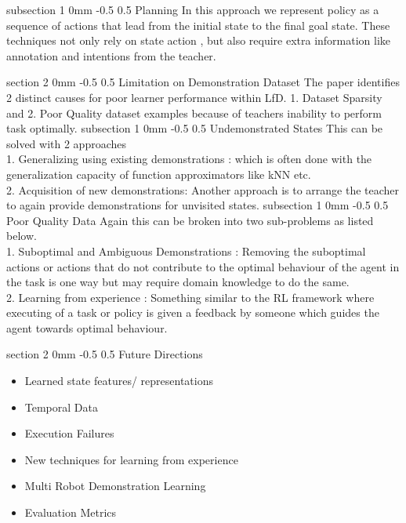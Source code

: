 \documentclass[twocolumn,11pt]{article}
\makeatletter
\renewcommand{\section}{\@startsection
{section}%
{2}%
{0mm}%
{-0.5\baselineskip}%
{0.5\baselineskip}%
{\bfseries\color{blue}}} %
\renewcommand{\subsection}{\@startsection
{subsection}%
{1}%
{0mm}%
{-0.5\baselineskip}%
{0.5\baselineskip}%
{\bfseries\color{blue}}} %
\makeatother
\begin{document}
\subsection{Planning}  In this approach we represent policy as a sequence of actions that lead from the initial state to the final goal state. These techniques not only rely on state action , but also require  extra information like annotation and intentions from the  teacher. 


\section{Limitation on Demonstration Dataset}
The paper  identifies  2  distinct causes for poor learner performance within LfD. 1. Dataset Sparsity  and 2. Poor Quality dataset  examples because of teachers inability to perform task optimally.
 \subsection{Undemonstrated States}
 This can  be solved with 2 approaches\\
  1. Generalizing using existing demonstrations : which  is often done with the generalization capacity of function approximators like kNN etc. \\
  2. Acquisition of new demonstrations: Another approach is to arrange the teacher to again provide demonstrations for unvisited  states. 
  \subsection{Poor Quality Data}
Again this can be broken into  two sub-problems  as listed below.\\
1. Suboptimal  and Ambiguous Demonstrations : Removing the suboptimal actions or actions that do not contribute to the optimal behaviour of the agent in the task is one way but may  require domain knowledge to do the same. \\
2. Learning from experience : Something similar to  the RL framework where executing of a task or policy is  given a feedback by someone which guides the  agent towards optimal behaviour. 

\section{Future Directions}
\begin{itemize}
\item Learned state  features/  representations 
\item Temporal Data 
\item Execution Failures 
\item New techniques for learning from experience
\item Multi Robot Demonstration Learning 
\item Evaluation Metrics

\end{itemize}

 





\end{document}

